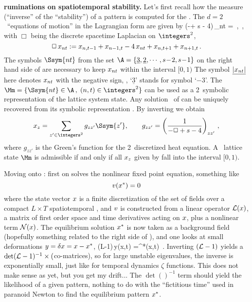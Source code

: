 \begin{description}
 { {\bf ruminations on spatiotemporal stability.}
Let's first recall how the measure (``inverse'' of the ``stability'') of a
pattern is computed for the \catlatt{}. The $d=2$ \catlatt\
``equations of motion'' in the {Lagrangian} form are given by
\beq
(-\Box + s - 4)\,\ssp_{nt} =
\,,\qquad
{} \in \A
\,,
with $\Box $ being the discrete spacetime Laplacian
on $\integers^2$,
\[
\Box\,x_{nt}:=                   x_{n,t-1} + x_{n-1,t}
                   - 4\,x_{nt} + x_{n,t+1} + x_{n+1,t}
\,.
\]
The  symbols  $\Ssym{nt}$ from  the set
$\A=\{\underline{3},\underline{2}, \cdots, s\!-\!2, s\!-\!1\}$
on the right hand side of  are  necessary  to keep
$x_{nt}$ within the  interval $[0,1)$
The  symbol   $ \underline{|x_{nt}|} $  here denotes $x_{nt}$
with the negative sign, \ie, `$\underline{3}$' stands for symbol `$-3$'.
The {\brick}
\(
\Mm= \{\Ssym{nt} \in \A \,,\; (n,t)\in \integers^2 \}
\)
can be used as a 2\dmn\ symbolic representation of the lattice system
state.
Any solution \Xx\ of  can be
uniquely recovered from its symbolic representation \Mm. By inverting
\refeq{CoupledCatsPC} we obtain
\begin{equation}
  \ssp_{z}=\sum_{z'\in\integers^2}g_{z z'} \Ssym{z'}, \qquad  g_{z z' }
       =\left(\frac{1}{-\Box +s -4}\right)_{zz'}
       \,,
\label{GreenFuncCoupledPC}
 \end{equation}
where  $g_{z z'}$
is the  Green's
function for the 2\dmn\ discretized heat equation.
A \catlatt\ lattice state $\Mm$ %
is admissible if and only if all  $x_{z}$ given by
 fall into the interval $[0,1)$.

Moving onto \KS: first on solves the nonlinear fixed point equation,
something like
\[
{\scriptsize v} (x^*) = 0
\]
where the state vector $x$ is a finite discretization of the set of
fields  \refeq{e-ksX} over a compact $L\times{T}$
spatiotemporal \twot, and ${\scriptsize v}$ is constructed from a
linear operator ${\cal L}(\ssp)$, a matrix of
first order space and time derivatives acting on $x$, plus
a nonlinear term ${\cal N}(\ssp)$.
The equilibrium solution $x^*$ is now taken as a background field
(hopefully something related to the right side of ), and
one looks at small deformations $y=\delta x = x-x^*$,
\beq
({\cal L}-1)\,y(x,t) =\ssp^*(x,t)
\,.
Inverting $({\cal L}-1)$ yields a $\det({\cal L}-1)^{-1}\times($co-matrices),
so for large unstable eigenvalues, the inverse is exponentially small, just
like for temporal dynamics $\zeta$ functions. This does not make sense as
yet, but you get my drift... The $\det()^{-1}$ term should yield the
likelihood of a given pattern, nothing to do with the ``fictitious time'' used
in paranoid Newton to find the equilibrium pattern $x^*$.

}
\end{description}
